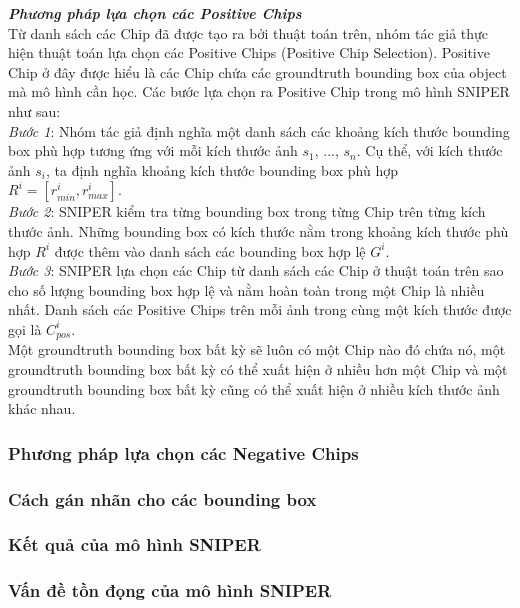 {    \noindent
    \textbf{\textit{Phương pháp lựa chọn các Positive Chips}} \\
    Từ danh sách các Chip đã được tạo ra bởi thuật toán trên, nhóm tác giả thực hiện thuật toán lựa chọn các Positive Chips (Positive Chip Selection).
    Positive Chip ở đây được hiểu là các Chip chứa các groundtruth bounding box của object mà mô hình cần học.
    Các bước lựa chọn ra Positive Chip trong mô hình SNIPER như sau: \\
    \textit{Bước 1}: Nhóm tác giả định nghĩa một danh sách các khoảng kích thước bounding box phù hợp tương ứng với mỗi kích thước ảnh {${s}_{1}$, ..., ${s}_{n}$}.
    Cụ thể, với kích thước ảnh ${s}_{i}$, ta định nghĩa khoảng kích thước bounding box phù hợp ${R}^{i} = [{r}_{min}^{i}, {r}_{max}^{i}]$. \\
    \textit{Bước 2}: SNIPER kiểm tra từng bounding box trong từng Chip trên từng kích thước ảnh.
    Những bounding box có kích thước nằm trong khoảng kích thước phù hợp ${R}^{i}$ được thêm vào danh sách các bounding box hợp lệ ${G}^{i}$. \\
    \textit{Bước 3}: SNIPER lựa chọn các Chip từ danh sách các Chip ở thuật toán trên sao cho số lượng bounding box hợp lệ và nằm hoàn toàn trong một Chip là nhiều nhất.
    Danh sách các Positive Chips trên mỗi ảnh trong cùng một kích thước được gọi là ${C}_{pos}^{i}$. \\
    Một groundtruth bounding box bất kỳ sẽ luôn có một Chip nào đó chứa nó, một groundtruth bounding box bất kỳ có thể xuất hiện ở nhiều hơn một Chip và một groundtruth bounding box bất kỳ cũng có thể xuất hiện ở nhiều kích thước ảnh khác nhau.

    \subsubsection{Phương pháp lựa chọn các Negative Chips}
    \subsubsection{Cách gán nhãn cho các bounding box}
    \subsubsection{Kết quả của mô hình SNIPER}
    \subsubsection{Vấn đề tồn đọng của mô hình SNIPER}

}
